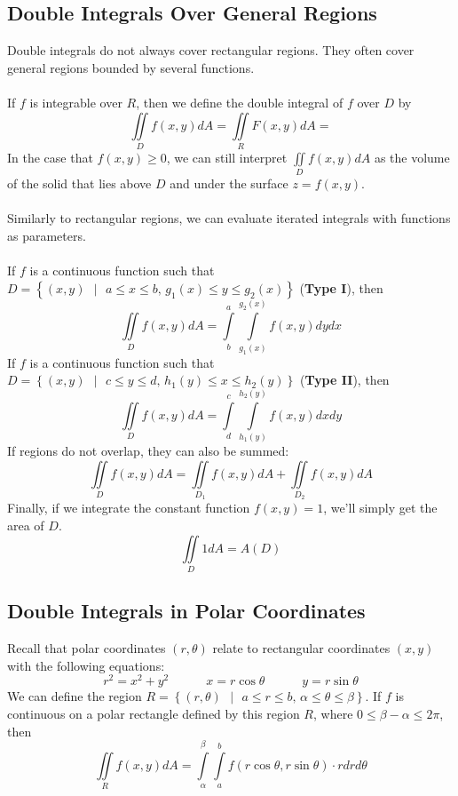 \documentclass[11pt]{article}
\begin{document}
\subsection{Double Integrals Over General Regions}
Double integrals do not always cover rectangular regions. They often cover general regions bounded by several functions.
\\ \\
If $f$ is integrable over $R$, then we define the double integral of $f$ over $D$ by 
$$\iint\limits_D f(x,y)dA = \iint\limits_{R} F(x,y)dA =$$
In the case that $f(x,y) \geq 0$, we can still interpret $\iint\limits_D f(x,y)dA$ as the volume of the solid that lies above $D$ and under the surface $z = f(x,y)$.
\\ \\
Similarly to rectangular regions, we can evaluate iterated integrals with functions as parameters. \\ \\ If $f$ is a continuous function such that $D = \left\lbrace (x,y)\text{ } | \text{ } a \leq x \leq b \text{, } g_1(x) \leq y \leq g_2(x) \right\rbrace$ (\textbf{Type I}), then
$$\iint\limits_{D} f(x,y)dA = \int\limits_{b}^{a} \int\limits_{g_1(x)}^{g_2(x)} f(x,y)dy dx$$
If $f$ is a continuous function such that $D = \left\lbrace (x,y)\text { } | \text{ } c \leq y \leq d \text{, } h_1(y) \leq x \leq h_2(y) \right\rbrace$ (\textbf{Type II}), then
$$\iint\limits_{D} f(x,y)dA = \int\limits_{d}^{c} \int\limits_{h_1(y)}^{h_2(y)} f(x,y)dx dy$$
If regions do not overlap, they can also be summed:
$$\iint\limits_{D} f(x,y)dA  = \iint\limits_{D_1} f(x,y)dA + \iint\limits_{D_2} f(x,y)dA $$
Finally, if we integrate the constant function $f(x,y) = 1$, we'll simply get the area of $D$. 
$$\iint\limits_{D} 1dA  = A(D)$$

\subsection{Double Integrals in Polar Coordinates}
Recall that polar coordinates $(r, \theta)$ relate to rectangular coordinates $(x,y)$ with the following equations:
$$r^2 = x^2 + y^2 \quad \quad \quad x = r\cos\theta \quad \quad \quad y = r\sin\theta$$
We can define the region $R = \left\lbrace (r,\theta)\text{ }  | \text{ } a \leq r \leq b \text{, } \alpha \leq \theta \leq \beta \right\rbrace$. If $f$ is continuous on a polar rectangle defined by this region $R$, where $ 0 \leq \beta - \alpha \leq 2\pi $, then $$\iint\limits_{R} f(x,y)dA = \int\limits_{\alpha}^{\beta} \int\limits_{a}^{b} f(r\cos\theta,r\sin\theta)\cdot rdrd\theta$$
\end{document}
